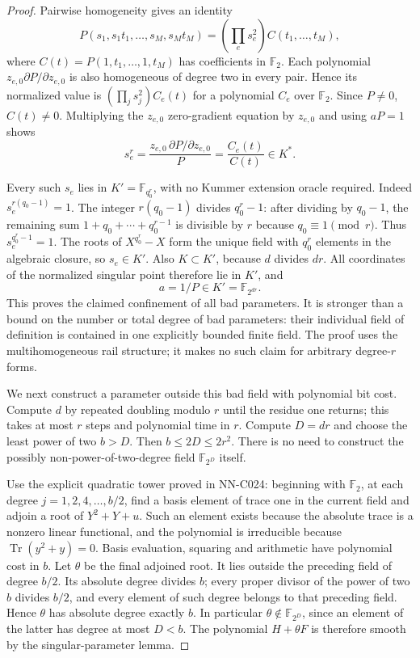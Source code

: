 \begin{proof}
Pairwise homogeneity gives an identity
\[
 P(s_1,s_1t_1,\ldots,s_M,s_Mt_M)
                 =\left(\prod_e s_e^2\right)C(t_1,\ldots,t_M),
\]
where $C(t)=P(1,t_1,\ldots,1,t_M)$ has coefficients in $\mathbb F_2$. Each polynomial $z_{e,0}\partial P/\partial z_{e,0}$ is also homogeneous of degree two in every pair. Hence its normalized value is $(\prod_j s_j^2)C_e(t)$ for a polynomial $C_e$ over $\mathbb F_2$. Since $P\ne0$, $C(t)\ne0$. Multiplying the $z_{e,0}$ zero-gradient equation by $z_{e,0}$ and using $aP=1$ shows
\[
            s_e^r=
            \frac{z_{e,0}\,\partial P/\partial z_{e,0}}{P}
                  =\frac{C_e(t)}{C(t)}\in K^*.
\]

Every such $s_e$ lies in $K'=\mathbb F_{q_0^r}$, with no Kummer extension oracle required. Indeed $s_e^{r(q_0-1)}=1$. The integer $r(q_0-1)$ divides $q_0^r-1$: after dividing by $q_0-1$, the remaining sum $1+q_0+\cdots+q_0^{r-1}$ is divisible by $r$ because $q_0\equiv1\pmod r$. Thus $s_e^{q_0^r-1}=1$. The roots of $X^{q_0^r}-X$ form the unique field with $q_0^r$ elements in the algebraic closure, so $s_e\in K'$. Also $K\subset K'$, because $d$ divides $dr$. All coordinates of the normalized singular point therefore lie in $K'$, and
\[
                         a=1/P\in K'=\mathbb F_{2^{dr}}.
\]
This proves the claimed confinement of all bad parameters. It is stronger than a bound on the number or total degree of bad parameters: their individual field of definition is contained in one explicitly bounded finite field. The proof uses the multihomogeneous rail structure; it makes no such claim for arbitrary degree-$r$ forms.

We next construct a parameter outside this bad field with polynomial bit cost. Compute $d$ by repeated doubling modulo $r$ until the residue one returns; this takes at most $r$ steps and polynomial time in $r$. Compute $D=dr$ and choose the least power of two $b>D$. Then $b\leq2D\leq2r^2$. There is no need to construct the possibly non-power-of-two-degree field $\mathbb F_{2^D}$ itself.

Use the explicit quadratic tower proved in NN-C024: beginning with $\mathbb F_2$, at each degree $j=1,2,4,\ldots,b/2$, find a basis element of trace one in the current field and adjoin a root of $Y^2+Y+u$. Such an element exists because the absolute trace is a nonzero linear functional, and the polynomial is irreducible because $\operatorname{Tr}(y^2+y)=0$. Basis evaluation, squaring and arithmetic have polynomial cost in $b$. Let $\theta$ be the final adjoined root. It lies outside the preceding field of degree $b/2$. Its absolute degree divides $b$; every proper divisor of the power of two $b$ divides $b/2$, and every element of such degree belongs to that preceding field. Hence $\theta$ has absolute degree exactly $b$. In particular $\theta\notin\mathbb F_{2^D}$, since an element of the latter has degree at most $D<b$. The polynomial $H+\theta F$ is therefore smooth by the singular-parameter lemma.


\end{proof}

